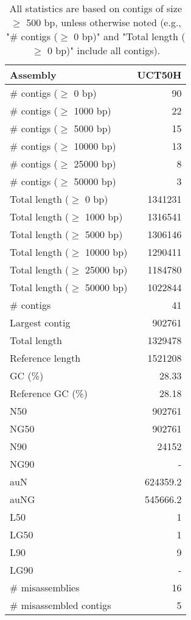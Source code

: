 \documentclass[12pt,a4paper]{article}
\begin{document}
\begin{table}[ht]
\begin{center}
\caption{All statistics are based on contigs of size $\geq$ 500 bp, unless otherwise noted (e.g., "\# contigs ($\geq$ 0 bp)" and "Total length ($\geq$ 0 bp)" include all contigs).}
\begin{tabular}{|l*{1}{|r}|}
\hline
Assembly & UCT50H \\ \hline
\# contigs ($\geq$ 0 bp) & 90 \\ \hline
\# contigs ($\geq$ 1000 bp) & 22 \\ \hline
\# contigs ($\geq$ 5000 bp) & 15 \\ \hline
\# contigs ($\geq$ 10000 bp) & 13 \\ \hline
\# contigs ($\geq$ 25000 bp) & 8 \\ \hline
\# contigs ($\geq$ 50000 bp) & 3 \\ \hline
Total length ($\geq$ 0 bp) & 1341231 \\ \hline
Total length ($\geq$ 1000 bp) & 1316541 \\ \hline
Total length ($\geq$ 5000 bp) & 1306146 \\ \hline
Total length ($\geq$ 10000 bp) & 1290411 \\ \hline
Total length ($\geq$ 25000 bp) & 1184780 \\ \hline
Total length ($\geq$ 50000 bp) & 1022844 \\ \hline
\# contigs & 41 \\ \hline
Largest contig & 902761 \\ \hline
Total length & 1329478 \\ \hline
Reference length & 1521208 \\ \hline
GC (\%) & 28.33 \\ \hline
Reference GC (\%) & 28.18 \\ \hline
N50 & 902761 \\ \hline
NG50 & 902761 \\ \hline
N90 & 24152 \\ \hline
NG90 & - \\ \hline
auN & 624359.2 \\ \hline
auNG & 545666.2 \\ \hline
L50 & 1 \\ \hline
LG50 & 1 \\ \hline
L90 & 9 \\ \hline
LG90 & - \\ \hline
\# misassemblies & 16 \\ \hline
\# misassembled contigs & 5 \\ \hline

\end{tabular}
\end{center}
\end{table}
\end{document}
